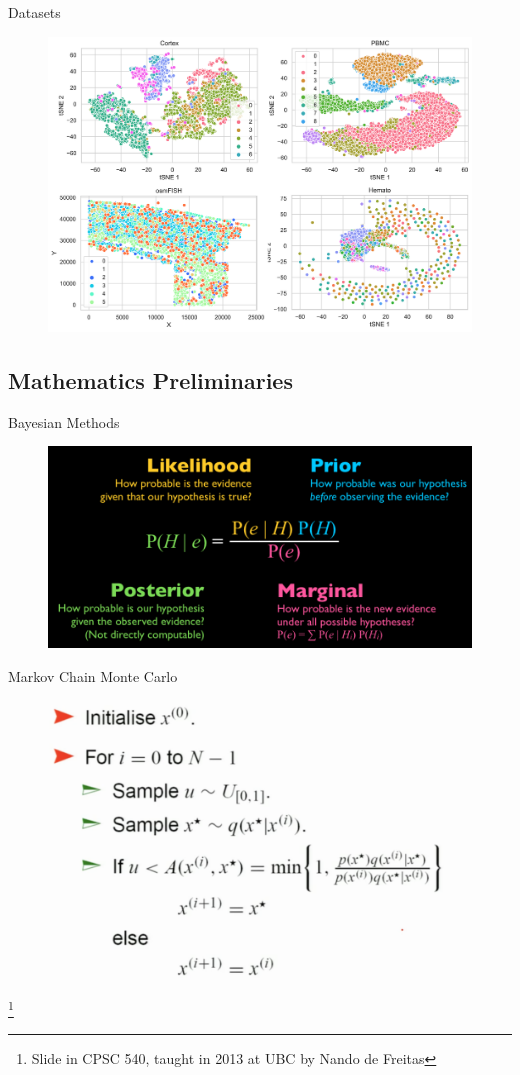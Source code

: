 \documentclass[handout,t]{beamer}
\newcommand\blfootnote[1]{%
  \begingroup
  \renewcommand\thefootnote{}\footnote{#1}%
  \addtocounter{footnote}{-1}%
  \endgroup
}
\begin{document}
\begin{frame}{Datasets}
\begin{figure}
  \includegraphics[width=0.8\columnwidth]{../figure/scatter.png}
\end{figure}
\end{frame}


\subsection{Mathematics Preliminaries}
\begin{frame}{Bayesian Methods}
\begin{figure}
\includegraphics[width=\columnwidth]{bayes.png}
\end{figure}
\end{frame}

\begin{frame}{Markov Chain Monte Carlo}
\vspace{-0.3cm}
\begin{figure}
\includegraphics[width=0.7\columnwidth]{mcmc.png}
\end{figure}
\vspace{-0.1cm}
\blfootnote{Slide in CPSC 540, taught in 2013 at UBC by Nando de Freitas}
\end{frame}
\end{document}
